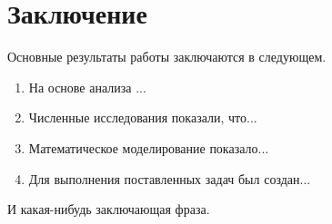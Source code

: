 \chapter*{Заключение}

Основные результаты работы заключаются в следующем.
\begin{enumerate}
 \item На основе анализа ...
 
 \item Численные исследования показали, что...

 \item Математическое моделирование показало...

 \item Для выполнения поставленных задач был создан...
\end{enumerate}
И какая-нибудь заключающая фраза.


